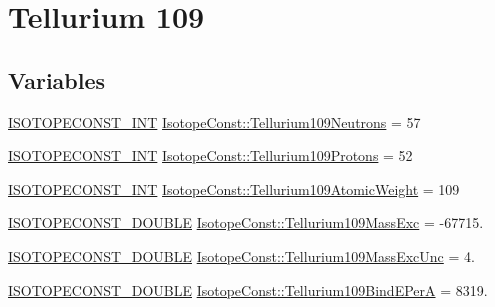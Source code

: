 \hypertarget{group___isotope_const-_tellurium-_te109}{}\section{Tellurium 109}
\label{group___isotope_const-_tellurium-_te109}
\subsection*{Variables}
\begin{DoxyCompactItemize}
\item 
\mbox{\hyperlink{group___isotope_const-_macros_ga5f18360b3e99483a35c32d789e62621c}{I\+S\+O\+T\+O\+P\+E\+C\+O\+N\+S\+T\+\_\+\+I\+NT}} \mbox{\hyperlink{group___isotope_const-_tellurium-_te109_ga9b322e7e509739b73964748279b74d53}{Isotope\+Const\+::\+Tellurium109\+Neutrons}} = 57
\item 
\mbox{\hyperlink{group___isotope_const-_macros_ga5f18360b3e99483a35c32d789e62621c}{I\+S\+O\+T\+O\+P\+E\+C\+O\+N\+S\+T\+\_\+\+I\+NT}} \mbox{\hyperlink{group___isotope_const-_tellurium-_te109_gaa470a06a9c0071bd0262cb53ae79ac35}{Isotope\+Const\+::\+Tellurium109\+Protons}} = 52
\item 
\mbox{\hyperlink{group___isotope_const-_macros_ga5f18360b3e99483a35c32d789e62621c}{I\+S\+O\+T\+O\+P\+E\+C\+O\+N\+S\+T\+\_\+\+I\+NT}} \mbox{\hyperlink{group___isotope_const-_tellurium-_te109_ga2340c0cd36682db650380b901c317bee}{Isotope\+Const\+::\+Tellurium109\+Atomic\+Weight}} = 109
\item 
\mbox{\hyperlink{group___isotope_const-_macros_ga8f45a7272ce02c0b4c65c44636ed719a}{I\+S\+O\+T\+O\+P\+E\+C\+O\+N\+S\+T\+\_\+\+D\+O\+U\+B\+LE}} \mbox{\hyperlink{group___isotope_const-_tellurium-_te109_gafda367abf9140687a5b210777caa93f6}{Isotope\+Const\+::\+Tellurium109\+Mass\+Exc}} = -\/67715.
\item 
\mbox{\hyperlink{group___isotope_const-_macros_ga8f45a7272ce02c0b4c65c44636ed719a}{I\+S\+O\+T\+O\+P\+E\+C\+O\+N\+S\+T\+\_\+\+D\+O\+U\+B\+LE}} \mbox{\hyperlink{group___isotope_const-_tellurium-_te109_ga7b14a275356761ea2923ee481eec6de9}{Isotope\+Const\+::\+Tellurium109\+Mass\+Exc\+Unc}} = 4.
\item 
\mbox{\hyperlink{group___isotope_const-_macros_ga8f45a7272ce02c0b4c65c44636ed719a}{I\+S\+O\+T\+O\+P\+E\+C\+O\+N\+S\+T\+\_\+\+D\+O\+U\+B\+LE}} \mbox{\hyperlink{group___isotope_const-_tellurium-_te109_ga54c7aee63524da5c486f1144dffd1c0f}{Isotope\+Const\+::\+Tellurium109\+Bind\+E\+PerA}} = 8319.
\item 

\end{DoxyCompactItemize}
